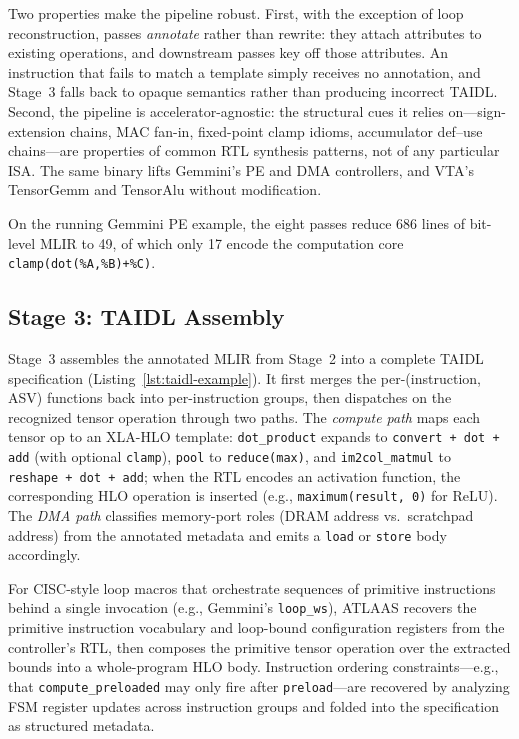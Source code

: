 Two properties make the pipeline robust.
First, with the exception of loop reconstruction, passes \emph{annotate} rather than rewrite: they attach attributes to existing operations, and downstream passes key off those attributes.
An instruction that fails to match a template simply receives no annotation, and Stage~3 falls back to opaque semantics rather than producing incorrect TAIDL.
Second, the pipeline is accelerator-agnostic: the structural cues it relies on---sign-extension chains, MAC fan-in, fixed-point clamp idioms, accumulator def--use chains---are properties of common RTL synthesis patterns, not of any particular ISA.
The same binary lifts Gemmini's PE and DMA controllers, and VTA's TensorGemm and TensorAlu without modification.

On the running Gemmini PE example, the eight passes reduce 686 lines of bit-level MLIR to 49, of which only 17 encode the computation core \texttt{clamp(dot(\%A,\%B)+\%C)}.

\subsection{Stage 3: TAIDL Assembly}
\label{subsec:stage3}

Stage~3 assembles the annotated MLIR from Stage~2 into a complete TAIDL specification (Listing~\ref{lst:taidl-example}).
It first merges the per-(instruction, ASV) functions back into per-instruction groups, then dispatches on the recognized tensor operation through two paths.
The \emph{compute path} maps each tensor op to an XLA-HLO template: \texttt{dot\_product} expands to \texttt{convert\,+\,dot\,+\,add} (with optional \texttt{clamp}), \texttt{pool} to \texttt{reduce(max)}, and \texttt{im2col\_matmul} to \texttt{reshape\,+\,dot\,+\,add}; when the RTL encodes an activation function, the corresponding HLO operation is inserted (e.g., \texttt{maximum(result,\,0)} for ReLU).
The \emph{DMA path} classifies memory-port roles (DRAM address vs.\ scratchpad address) from the annotated metadata and emits a \texttt{load} or \texttt{store} body accordingly.

For CISC-style loop macros that orchestrate sequences of primitive instructions behind a single invocation (e.g., Gemmini's \texttt{loop\_ws}), ATLAAS recovers the primitive instruction vocabulary and loop-bound configuration registers from the controller's RTL, then composes the primitive tensor operation over the extracted bounds into a whole-program HLO body.
Instruction ordering constraints---e.g., that \texttt{compute\_preloaded} may only fire after \texttt{preload}---are recovered by analyzing FSM register updates across instruction groups and folded into the specification as structured metadata.
